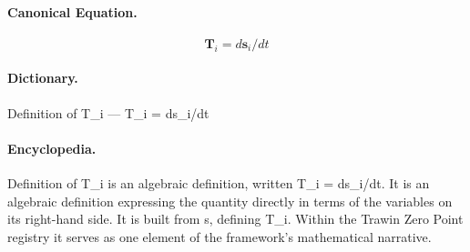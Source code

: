 \paragraph{Canonical Equation.}
\[
\mathbf{T}_i = d\mathbf{s}_i/dt
\]

\paragraph{Dictionary.}
Definition of T\_i — T\_i = ds\_i/dt

\paragraph{Encyclopedia.}
Definition of T\_i is an algebraic definition, written T\_i = ds\_i/dt. It is an algebraic definition expressing the quantity directly in terms of the variables on its right-hand side. It is built from s, defining T\_i. Within the Trawin Zero Point registry it serves as one element of the framework's mathematical narrative.
